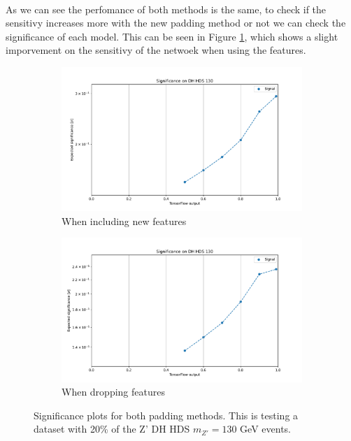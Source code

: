 \documentclass[12pt, a4paper]{book}
\begin{document}
\\As we can see the perfomance of both methods is the same, to check if the sensitivy increases more with the new padding method or not we can check the significance of each model. This can be seen in Figure \ref{fig:NN_pad_SIG}, which shows a slight imporvement on the sensitivy of the netwoek when using the features.
\begin{figure}[!ht]
	\centering
	\begin{subfigure}[b]{0.49\textwidth}
      \centering
      \includegraphics[width=1\textwidth]{New_pad/EXP_SIG.pdf}
      \caption{When including new features}
   \end{subfigure}
   \hfill
	\begin{subfigure}[b]{0.49\textwidth}
      \centering
      \includegraphics[width=1\textwidth]{No_pad/EXP_SIG.pdf}
      \caption{When dropping features}
   \end{subfigure}
   \caption[Significance plots for both padding methods]{Significance plots for both padding methods.  This is testing a dataset with 20\% of the Z' DH HDS $m_{Z'}=130$ GeV events.}\label{fig:NN_pad_SIG}
\end{figure}
\clearpage
\end{document}

